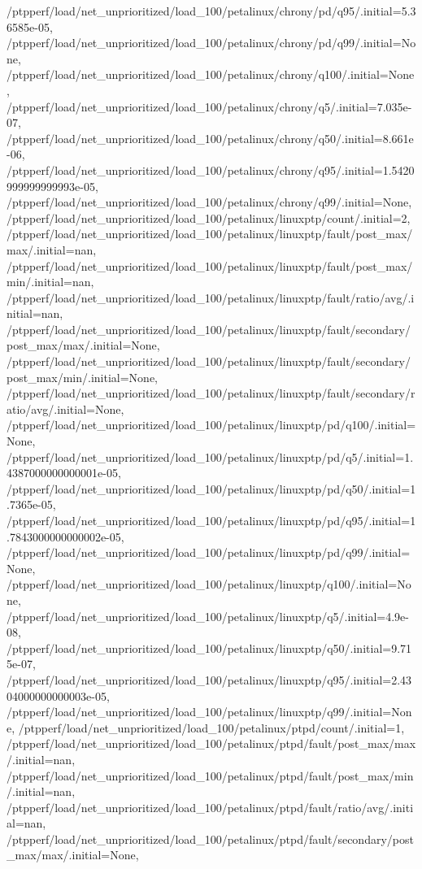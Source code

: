 {    /ptpperf/load/net_unprioritized/load_100/petalinux/chrony/pd/q95/.initial=5.36585e-05,
    /ptpperf/load/net_unprioritized/load_100/petalinux/chrony/pd/q99/.initial=None,
    /ptpperf/load/net_unprioritized/load_100/petalinux/chrony/q100/.initial=None,
    /ptpperf/load/net_unprioritized/load_100/petalinux/chrony/q5/.initial=7.035e-07,
    /ptpperf/load/net_unprioritized/load_100/petalinux/chrony/q50/.initial=8.661e-06,
    /ptpperf/load/net_unprioritized/load_100/petalinux/chrony/q95/.initial=1.5420999999999993e-05,
    /ptpperf/load/net_unprioritized/load_100/petalinux/chrony/q99/.initial=None,
    /ptpperf/load/net_unprioritized/load_100/petalinux/linuxptp/count/.initial=2,
    /ptpperf/load/net_unprioritized/load_100/petalinux/linuxptp/fault/post_max/max/.initial=nan,
    /ptpperf/load/net_unprioritized/load_100/petalinux/linuxptp/fault/post_max/min/.initial=nan,
    /ptpperf/load/net_unprioritized/load_100/petalinux/linuxptp/fault/ratio/avg/.initial=nan,
    /ptpperf/load/net_unprioritized/load_100/petalinux/linuxptp/fault/secondary/post_max/max/.initial=None,
    /ptpperf/load/net_unprioritized/load_100/petalinux/linuxptp/fault/secondary/post_max/min/.initial=None,
    /ptpperf/load/net_unprioritized/load_100/petalinux/linuxptp/fault/secondary/ratio/avg/.initial=None,
    /ptpperf/load/net_unprioritized/load_100/petalinux/linuxptp/pd/q100/.initial=None,
    /ptpperf/load/net_unprioritized/load_100/petalinux/linuxptp/pd/q5/.initial=1.4387000000000001e-05,
    /ptpperf/load/net_unprioritized/load_100/petalinux/linuxptp/pd/q50/.initial=1.7365e-05,
    /ptpperf/load/net_unprioritized/load_100/petalinux/linuxptp/pd/q95/.initial=1.7843000000000002e-05,
    /ptpperf/load/net_unprioritized/load_100/petalinux/linuxptp/pd/q99/.initial=None,
    /ptpperf/load/net_unprioritized/load_100/petalinux/linuxptp/q100/.initial=None,
    /ptpperf/load/net_unprioritized/load_100/petalinux/linuxptp/q5/.initial=4.9e-08,
    /ptpperf/load/net_unprioritized/load_100/petalinux/linuxptp/q50/.initial=9.715e-07,
    /ptpperf/load/net_unprioritized/load_100/petalinux/linuxptp/q95/.initial=2.4304000000000003e-05,
    /ptpperf/load/net_unprioritized/load_100/petalinux/linuxptp/q99/.initial=None,
    /ptpperf/load/net_unprioritized/load_100/petalinux/ptpd/count/.initial=1,
    /ptpperf/load/net_unprioritized/load_100/petalinux/ptpd/fault/post_max/max/.initial=nan,
    /ptpperf/load/net_unprioritized/load_100/petalinux/ptpd/fault/post_max/min/.initial=nan,
    /ptpperf/load/net_unprioritized/load_100/petalinux/ptpd/fault/ratio/avg/.initial=nan,
    /ptpperf/load/net_unprioritized/load_100/petalinux/ptpd/fault/secondary/post_max/max/.initial=None,
}
